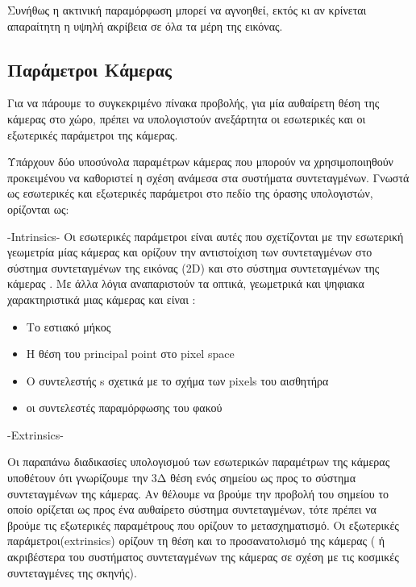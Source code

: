 Συνήθως η ακτινική παραμόρφωση μπορεί να αγνοηθεί, εκτός κι αν κρίνεται απαραίτητη η υψηλή ακρίβεια σε όλα τα μέρη της εικόνας. 








\subsection{Παράμετροι Κάμερας}

Για να πάρουμε το συγκεκριμένο πίνακα προβολής, για μία αυθαίρετη θέση της κάμερας στο χώρο, πρέπει να υπολογιστούν ανεξάρτητα οι εσωτερικές και οι εξωτερικές παράμετροι της κάμερας. 


Υπάρχουν δύο υποσύνολα παραμέτρων κάμερας που μπορούν να χρησιμοποιηθούν προκειμένου να καθοριστεί η σχέση ανάμεσα στα συστήματα συντεταγμένων.
Γνωστά ως εσωτερικές και εξωτερικές παράμετροι στο πεδίο της όρασης υπολογιστών, ορίζονται ως:



-Intrinsics-
Οι εσωτερικές παράμετροι είναι αυτές που σχετίζονται με την εσωτερική γεωμετρία μίας κάμερας και ορίζουν την αντιστοίχιση των συντεταγμένων στο σύστημα συντεταγμένων της εικόνας (2D) και στο σύστημα συντεταγμένων της κάμερας \cite{Malik2002}. Με άλλα λόγια αναπαριστούν τα οπτικά, γεωμετρικά και ψηφιακα χαρακτηριστικά μιας κάμερας και είναι :

\begin{itemize}
\item Το εστιακό μήκος
\item Η θέση του principal point στο pixel space
\item Ο συντελεστής s σχετικά με το σχήμα των pixels του αισθητήρα
\item οι συντελεστές παραμόρφωσης του φακού
\end{itemize}




-Extrinsics-

Οι παραπάνω διαδικασίες υπολογισμού των εσωτερικών παραμέτρων της κάμερας υποθέτουν ότι γνωρίζουμε την 3Δ θέση ενός σημείου ως προς το σύστημα συντεταγμένων της κάμερας. Αν θέλουμε να βρούμε την προβολή του σημείου το οποίο ορίζεται ως προς ένα αυθαίρετο σύστημα συντεταγμένων, τότε πρέπει να βρούμε τις εξωτερικές παραμέτρους που ορίζουν το μετασχηματισμό. Οι εξωτερικές παράμετροι(extrinsics) ορίζουν τη θέση και το προσανατολισμό της κάμερας ( ή ακριβέστερα του συστήματος συντεταγμένων της κάμερας σε σχέση με τις κοσμικές συντεταγμένες της σκηνής). 

